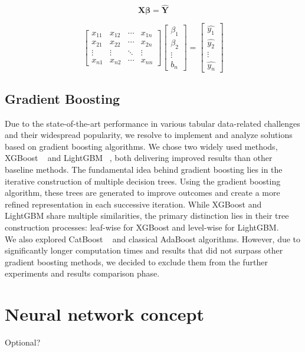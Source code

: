  \[
    \mathbf{X} \boldsymbol\beta = \mathbf{\hat{Y}}
 \]

 \[
    \begin{bmatrix}
    x_{11} & x_{12} & \cdots & x_{1n}\\
    x_{21} & x_{22} & \cdots & x_{2n}\\
    \vdots & \vdots & \ddots & \vdots\\
    x_{n1} & x_{n2} & \cdots & x_{nn}
    \end{bmatrix}
    \begin{bmatrix}
    \beta_1\\\beta_2\\ \vdots\\b_n
    \end{bmatrix}
    =\begin{bmatrix}
    \hat{y_1}\\\hat{y_2}\\ \vdots\\\hat{y_n}
    \end{bmatrix}
\]
 \subsection{Gradient Boosting}
Due to the state-of-the-art performance in various tabular data-related challenges and their widespread popularity, we resolve to implement and analyze solutions based on gradient boosting algorithms. We chose two widely used methods, XGBoost ~\cite{Chen_2016} and LightGBM ~\cite{ke2017lightgbm}, both delivering improved results than other baseline methods. The fundamental idea behind gradient boosting lies in the iterative construction of multiple decision trees. Using the gradient boosting algorithm, these trees are generated to improve outcomes and create a more refined representation in each successive iteration. While XGBoost and LightGBM share multiple similarities, the primary distinction lies in their tree construction processes: leaf-wise for XGBoost and level-wise for LightGBM.  \\

\noindent We also explored CatBoost ~\cite{prokhorenkova2019catboost} and classical AdaBoost algorithms. However, due to significantly longer computation times and results that did not surpass other gradient boosting methods, we decided to exclude them from the further experiments and results comparison phase.

\section{Neural network concept}
Optional? \\

